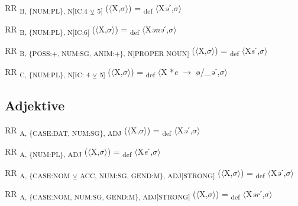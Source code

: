 {\begin{exe}
 RR \textsubscript{B, \{NUM:PL\}, N[IC:4} \textsubscript{${\veebar}$}\textsubscript{ 5]} ($\langle$X,$\sigma $$\rangle$) = \textsubscript{def} $\langle$X\textit{ə}ˊ,$\sigma $$\rangle$
\end{exe}

\begin{exe}
 RR \textsubscript{B, \{NUM:PL\}, N[IC:6]} ($\langle$X,$\sigma $$\rangle$) = \textsubscript{def} $\langle$X\textit{ənə}ˊ,$\sigma $$\rangle$
\end{exe}

\begin{exe}
 RR \textsubscript{B, \{POSS:+, NUM:SG, ANIM:+\}, N[PROPER NOUN]} ($\langle$X,$\sigma $$\rangle$) = \textsubscript{def} $\langle$X\textit{s}ˊ,$\sigma $$\rangle$
\end{exe}

\begin{exe}
 RR \textsubscript{C, \{NUM:PL\}, N[IC: 4} \textsubscript{${\veebar}$} \textsubscript{5]} ($\langle$X,$\sigma $$\rangle$) = \textsubscript{def} $\langle$X *\textit{e} $\rightarrow$ ø/\_\textit{ə}ˊ,$\sigma $$\rangle$
\end{exe}

\subsection{Adjektive}

\begin{exe}
 RR \textsubscript{A, \{CASE:DAT, NUM:SG\}, ADJ} ($\langle$X,$\sigma $$\rangle$) = \textsubscript{def} $\langle$X\textit{ə}ˊ,$\sigma $$\rangle$
\end{exe}

\begin{exe}
 RR \textsubscript{A, \{NUM:PL\}, ADJ} ($\langle$X,$\sigma $$\rangle$) = \textsubscript{def} $\langle$X\textit{e}ˊ,$\sigma $$\rangle$
\end{exe}

\begin{exe}
 RR \textsubscript{A, \{CASE:NOM} \textsubscript{${\veebar}$}\textsubscript{ ACC, NUM:SG, GEND:M\}, ADJ[STRONG]} ($\langle$X,$\sigma $$\rangle$) = \textsubscript{def} $\langle$X\textit{ə}ˊ,$\sigma $$\rangle$
\end{exe}

\begin{exe}
 RR \textsubscript{A, \{CASE:NOM, NUM:SG, GEND:M\}, ADJ[STRONG]} ($\langle$X,$\sigma $$\rangle$) = \textsubscript{def} $\langle$X\textit{ər}ˊ,$\sigma $$\rangle$
\end{exe}

}
